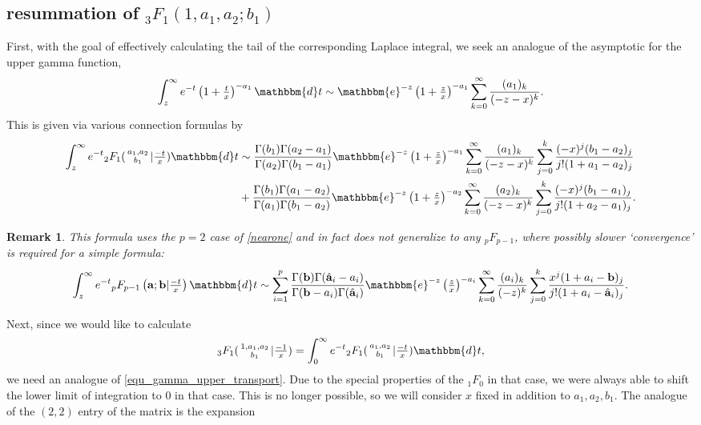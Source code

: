 \documentclass[12pt]{article}
\newcommand{\ee}[0] {\mathbbm{e}}
\newcommand{\dd}[0] {\mathbbm{d}}
\numberwithin{equation}{section}
\newtheorem{remark}[theorem]{Remark}
\newcommand{\FFs}[6] {{}_{#1}{#2}_{#3} ( \begin{smallmatrix} #4 \\ #5 \end{smallmatrix} | {#6}  )}
\newcommand{\FFf}[5] {{}_{#1}{#2}_{#3} \left(#4 | {#5} \right)}
\newcommand{\bfa}[0] {\mathbf{a}}
\newcommand{\bfb}[0] {\mathbf{b}}
\begin{document}
\subsection{resummation of ${}_3 F_1(1,a_1,a_2;b_1)$}
First, with the goal of effectively calculating the tail of the corresponding Laplace integral, we seek an analogue of the asymptotic for the upper gamma function,
\begin{equation*}
\int_{z}^{\infty} e^{-t} \left(1+\tfrac{t}{x}\right)^{-a_1} \dd t \sim \ee^{-z} \left(1+\tfrac{z}{x}\right)^{-a_1} \sum_{k=0}^{\infty} \frac{(a_1)_k}{(-z-x)^k} \text{.}
\end{equation*}
This is given via various connection formulas by
\begin{equation}
\label{equ_3f1_int_tail}
\begin{alignedat}{3}
\int_{z}^{\infty} e^{-t} \FFs{2}{F}{1}{a_1,a_2}{b_1}{\tfrac{-t}{x}} \dd t &\sim \frac{\Gamma(b_1)\Gamma(a_2-a_1)}{\Gamma(a_2)\Gamma(b_1-a_1)}\ee^{-z} \left(1+\tfrac{z}{x}\right)^{-a_1} \sum_{k=0}^{\infty} \frac{(a_1)_k}{(-z-x)^k} \sum_{j=0}^{k} \frac{(-x)^j(b_1-a_2)_j}{j!(1+a_1-a_2)_j}\\
&+\frac{\Gamma(b_1)\Gamma(a_1-a_2)}{\Gamma(a_1)\Gamma(b_1-a_2)}\ee^{-z} \left(1+\tfrac{z}{x}\right)^{-a_2} \sum_{k=0}^{\infty} \frac{(a_2)_k}{(-z-x)^k} \sum_{j=0}^{k} \frac{(-x)^j(b_1-a_1)_j}{j!(1+a_2-a_1)_j} \text{.}
\end{alignedat}
\end{equation}
\begin{remark}
This formula uses the $p=2$ case of \eqref{nearone} and in fact does not generalize to any ${}_p F_{p-1}$, where possibly slower `convergence' is required for a simple formula:
\begin{equation*}
\int_{z}^{\infty} e^{-t} \FFf{p}{F}{p-1}{\bfa; \bfb}{\tfrac{-t}{x}}  \dd t \sim \sum_{i=1}^{p} \frac{\Gamma(\mathbf{b}) \Gamma(\hat{\mathbf{a}}_i-a_i)}{\Gamma(\mathbf{b}-a_i) \Gamma(\hat{\mathbf{a}}_i)} \ee^{-z} \left(\tfrac{z}{x}\right)^{-a_i} \sum_{k=0}^{\infty} \frac{(a_i)_k}{(-z)^k} \sum_{j=0}^{k} \frac{x^j(1+a_i-\mathbf{b})_j}{j!(1+a_i-\hat{\mathbf{a}}_i)_j}\text{.}
\end{equation*}
\end{remark}
Next, since we would like to calculate
\begin{equation*}
\FFs{3}{F}{1}{1,a_1,a_2}{b_1}{\tfrac{-1}{x}} = \int_{0}^{\infty} e^{-t} \FFs{2}{F}{1}{a_1,a_2}{b_1}{\tfrac{-t}{x}} \dd t\text{,}
\end{equation*}
we need an analogue of \eqref{equ_gamma_upper_transport}. Due to the special properties of the ${}_1 F_{0}$ in that case, we were always able to shift the lower limit of integration to $0$ in that case. This is no longer possible, so we will consider $x$ fixed in addition to $a_1,a_2,b_1$. The analogue of the $(2,2)$ entry of the matrix is the expansion
\end{document}
